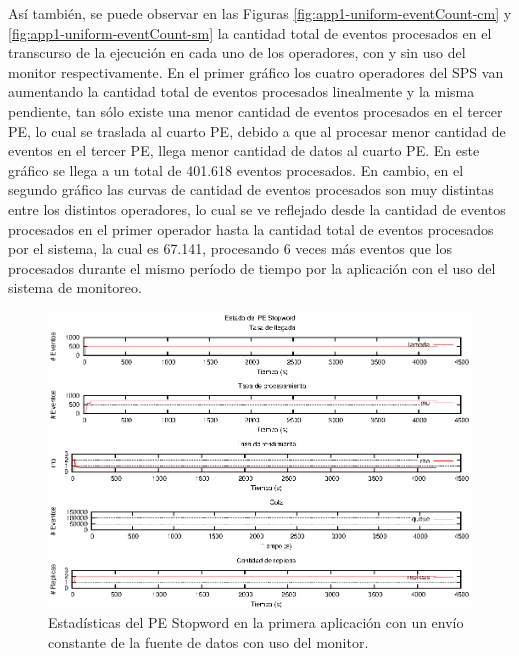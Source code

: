 Así también, se puede observar en las Figuras \ref{fig:app1-uniform-eventCount-cm} y \ref{fig:app1-uniform-eventCount-sm} la cantidad total de eventos procesados en el transcurso de la ejecución en cada uno de los operadores, con y sin uso del monitor respectivamente. En el primer gráfico los cuatro operadores del SPS van aumentando la cantidad total de eventos procesados linealmente y la misma pendiente, tan sólo existe una menor cantidad de eventos procesados en el tercer PE, lo cual se traslada al cuarto PE, debido a que al procesar menor cantidad de eventos en el tercer PE, llega menor cantidad de datos al cuarto PE. En este gráfico se llega a un total de 401.618 eventos procesados. En cambio, en el segundo gráfico las curvas de cantidad de eventos procesados son muy distintas entre los distintos operadores, lo cual se ve reflejado desde la cantidad de eventos procesados en el primer operador hasta la cantidad total de eventos procesados por el sistema, la cual es 67.141, procesando 6 veces más eventos que los procesados durante el mismo período de tiempo por la aplicación con el uso del sistema de monitoreo.

\begin{figure}[p]
\centering
    \includegraphics[scale=1.1]{images/exp/app1/uniform/cm/statusStopwordPE.eps}
    \caption{Estadísticas del PE Stopword en la primera aplicación con un envío constante de la fuente de datos con uso del monitor.}
    \label{fig:app1-uniform-statusStopwordPE-cm}
\end{figure}

